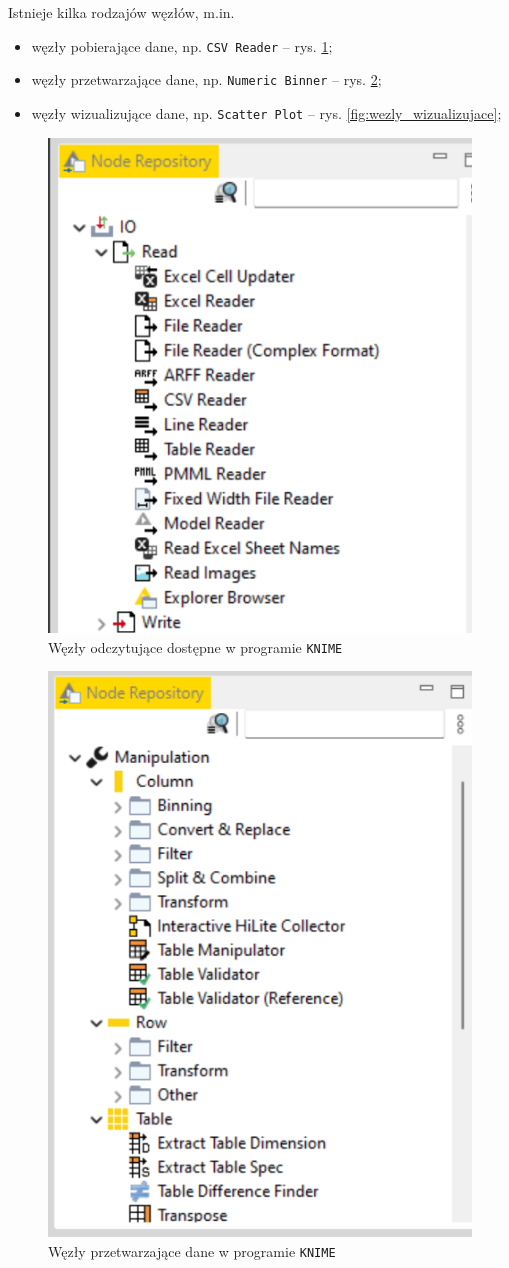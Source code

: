 \documentclass[11pt]{report}
\begin{document}
Istnieje kilka rodzajów węzłów, m.in.

\begin{itemize}
    \item węzły pobierające dane, np. \texttt{CSV Reader} -- rys. \ref{fig:wezly_odczytujace};
    \item węzły przetwarzające dane, np. \texttt{Numeric Binner} -- rys. \ref{fig:wezly_przetwarzajace};
    \item węzły wizualizujące dane, np. \texttt{Scatter Plot} -- rys. \ref{fig:wezly_wizualizujace};
\end{itemize}

\begin{figure}[h]
    \centering
    \includegraphics[width=.6\textwidth]{wezly_odczytujace.png}
    \caption{Węzły odczytujące dostępne w programie \texttt{KNIME}\label{fig:wezly_odczytujace}}
\end{figure}

\begin{figure}[h]
    \centering
    \includegraphics[width=.6\textwidth]{wezly_przetwarzajace.png}
    \caption{Węzły przetwarzające dane w programie \texttt{KNIME}\label{fig:wezly_przetwarzajace}}
\end{figure}
\end{document}
